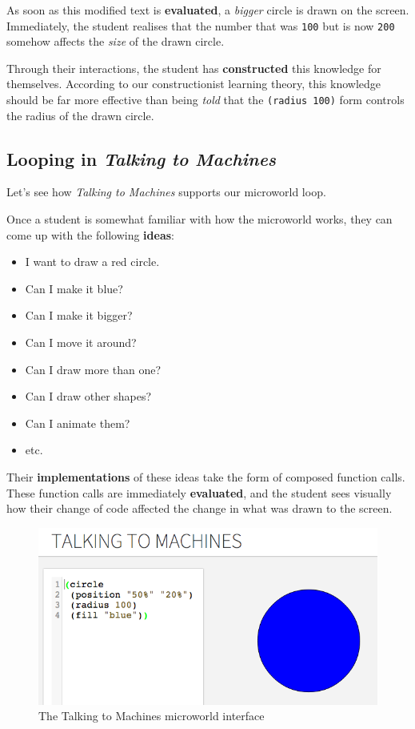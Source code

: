 As soon as this modified text is \textbf{evaluated}, a \emph{bigger} circle is drawn on the screen. Immediately, the student realises
that the number that was \texttt{100} but is now \texttt{200} somehow affects the
\emph{size} of the drawn circle.

Through their interactions, the student has \textbf{constructed} this
knowledge for themselves. According to our constructionist learning
theory, this knowledge should be far more effective than being
\emph{told} that the \texttt{(radius 100)} form controls the radius of
the drawn circle.

\subsection{Looping in \emph{Talking to Machines}}

Let's see how \emph{Talking to Machines} supports our microworld loop.

Once a student is somewhat familiar with how the microworld works, they
can come up with the following \textbf{ideas}: 

\begin{itemize}
\item I want to draw a red circle. 
\item Can I make it blue? 
\item Can I make it bigger?
\item Can I move it around? 
\item Can I draw more than one? 
\item Can I draw other shapes? 
\item Can I animate them?
\item etc.
\end{itemize}

Their \textbf{implementations} of these ideas take the form of composed
function calls. These function calls are immediately \textbf{evaluated},
and the student sees visually how their change of code affected the
change in what was drawn to the screen.

\begin{figure}[ht!]
\centering
\includegraphics[width=115mm]{img/ttmachines_interface.png}
\caption{The Talking to Machines microworld interface}
\label{overflow}
\end{figure}

